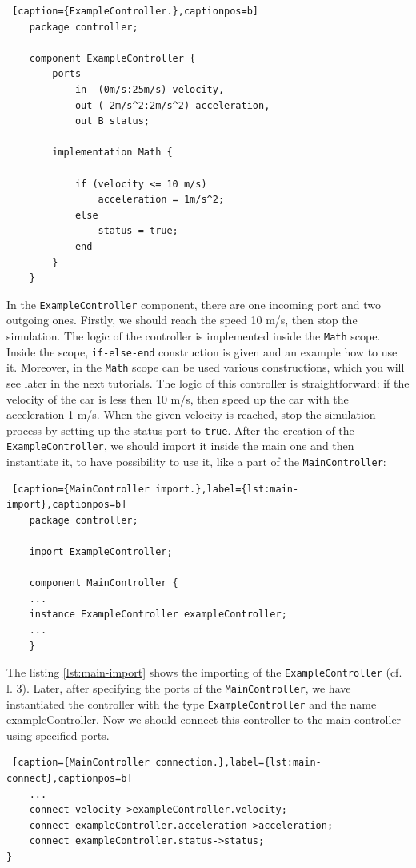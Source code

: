 \bigskip
\begin{lstlisting} [caption={ExampleController.},captionpos=b]
    package controller;

    component ExampleController {
	    ports
		    in  (0m/s:25m/s) velocity,
		    out (-2m/s^2:2m/s^2) acceleration,
		    out B status;

	    implementation Math {
		
		    if (velocity <= 10 m/s)
    	        acceleration = 1m/s^2;
    	    else
    	    	status = true;
            end
	    }
    }
\end{lstlisting}
\bigskip
In the \texttt{ExampleController} component, there are one incoming port and two outgoing ones. Firstly, we should reach the speed 10 m/s, then stop the simulation. The logic of the controller is implemented inside the \texttt{Math} scope. Inside the scope, \texttt{if-else-end} construction is given and an example how to use it. Moreover, in the \texttt{Math} scope can be used various constructions, which you will see later in the next tutorials. The logic of this controller is straightforward: if the velocity of the car is less then 10 m/s, then speed up the car with the acceleration 1 m/s. When the given velocity is reached, stop the simulation process by setting up the status port to \texttt{true}. \newline
After the creation of the \texttt{ExampleController}, we should import it inside the main one and then instantiate it, to have possibility to use it, like a part of the \texttt{MainController}:
\bigskip
\begin{lstlisting} [caption={MainController import.},label={lst:main-import},captionpos=b]
    package controller;

    import ExampleController;

    component MainController { 
    ...
    instance ExampleController exampleController;
    ...
    }
\end{lstlisting}
\bigskip
The listing \ref{lst:main-import} shows the importing of the \texttt{ExampleController} (cf. l. 3). Later, after specifying the ports of the \texttt{MainController}, we have instantiated the controller with the type \texttt{ExampleController} and the name exampleController. Now we should connect this controller to the main controller using specified ports.
\bigskip
\begin{lstlisting} [caption={MainController connection.},label={lst:main-connect},captionpos=b]
    ...
    connect velocity->exampleController.velocity;
    connect exampleController.acceleration->acceleration;
    connect exampleController.status->status;
}
\end{lstlisting}
